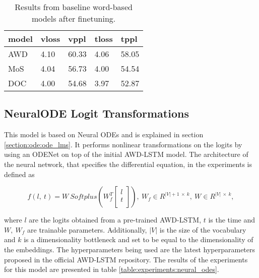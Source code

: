 \begin{table}
\centering
\caption{Results from baseline word-based models after finetuning.}
\begin{tabular}{|l|l|l|l|l|}
\hline
\textbf{model} & \textbf{vloss} & \textbf{vppl}  & \textbf{tloss} & \textbf{tppl}  \\ \hline
AWD   & 4.10  & 60.33 & 4.06  & 58.05 \\ \hline
MoS   & 4.04  & 56.73 & 4.00  & 54.54 \\ \hline
DOC   & 4.00  & 54.68 & 3.97  & 52.87 \\ \hline
\end{tabular}
\label{table:experiments:baselines_word_finetuned}
\end{table}

\subsection{NeuralODE Logit Transformations}
This model is based on Neural ODEs and is explained in section \ref{section:ode:ode_lms}. It performs nonlinear transformations on the logits by using an ODENet on top of the initial AWD-LSTM model. The architecture of the neural network, that specifies the differential equation, in the experiments is defined as

\begin{displaymath}
    f(l, \ t) = W \ Softplus(W_f^T 
        \begin{bmatrix}
           l \\
           t \\
        \end{bmatrix}),
        \ W_f \in R^{|V|+1 \ \times \ k}, \ W \in R^{|V| \ \times \ k},
\end{displaymath}

where $ l $ are the logits obtained from a pre-trained AWD-LSTM, $ t $ is the time and $ W, \ W_f $ are trainable parameters. Additionally, $ |V| $ is the size of the vocabulary and $ k $ is a dimensionality bottleneck and set to be equal to the dimensionality of the embeddings. The hyperparameters being used are the latest hyperparameters proposed in the official AWD-LSTM repository. The results of the experiments for this model are presented in table \ref{table:experiments:neural_odes}.

